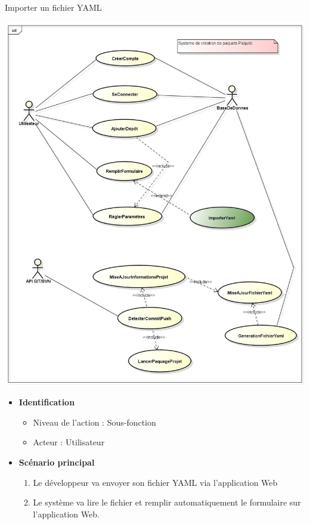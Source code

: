 \documentclass[9pt,xcolor=dvipsnames]{beamer}
\begin{document}
\begin{frame}{Importer un fichier YAML}
  \begin{minipage}{0.40\textwidth}
    \begin{flushleft}
      \includegraphics[scale=\largeur]{../img/Diagram_importerYaml.jpg}
    \end{flushleft}
  \end{minipage}
  \hfill
  \begin{minipage}{0.5\textwidth}
    \begin{flushright}
      \begin{itemize}
      \item \textbf{Identification}
        \begin{itemize}
        \item[] Niveau de l'action : Sous-fonction
        \item[] Acteur : Utilisateur
        \end{itemize}
      \item \textbf{Scénario principal}
        \begin{enumerate}
        \item Le développeur va envoyer son fichier YAML via l'application Web
        \item Le système va lire le fichier et remplir automatiquement le formulaire sur l'application Web.
        \end{enumerate}
      \end{itemize}
    \end{flushright}
  \end{minipage}
\end{frame}
\end{document}
